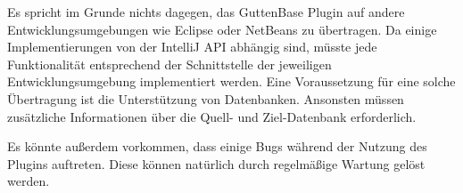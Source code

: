 Es spricht im Grunde nichts dagegen, das GuttenBase Plugin auf andere Entwicklungsumgebungen wie Eclipse oder NetBeans zu übertragen. Da einige Implementierungen von der IntelliJ API abhängig sind, müsste jede Funktionalität entsprechend der Schnittstelle der jeweiligen Entwicklungsumgebung implementiert werden. Eine Voraussetzung für eine solche Übertragung ist die Unterstützung von Datenbanken. Ansonsten müssen zusätzliche Informationen über die Quell- und Ziel-Datenbank erforderlich.

Es könnte außerdem vorkommen, dass einige Bugs während der Nutzung des Plugins auftreten. Diese können natürlich durch regelmäßige Wartung gelöst werden.

